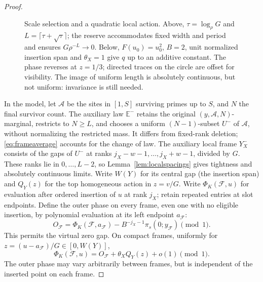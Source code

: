 \documentclass[11pt,a4paper]{article}
\newcommand{\E}{\mathbb E}
\begin{document}
\begin{proof}
\begin{figure}[t]
\caption{Scale selection and a quadratic local action.
Above, $\tau=\log_\rho G$ and $L=\lceil\tau+\sqrt\tau\rceil$;
the reserve accommodates fixed width and period and ensures $G\rho^{-L}\to0$.
Below, $F(u_0)=u_0^2$, $B=2$, unit normalized insertion span and
$\theta_X=1$ give $q$ up to an additive constant.
The phase reverses at $z=1/3$; directed traces on the circle are offset
for visibility. The image of uniform length is absolutely continuous,
but not uniform: invariance is still needed.}
\label{fig:scale}
\end{figure}

In the model, let $\mathcal A$ be the sites in $[1,S]$ surviving primes
up to $S$, and $N$ the final survivor count. The auxiliary law $\E^-$
retains the original $(y,\mathcal A,N)$-marginal, restricts to $N\ge L$,
and chooses a uniform $(N-1)$-subset $U^-$ of $\mathcal A$, without
normalizing the restricted mass. It differs from fixed-rank deletion;
\eqref{eq:frameaverage} accounts for the change of law.
The auxiliary local frame $Y_X^-$ consists of the gaps of $U^-$ at
ranks $j_X-w-1,\ldots,j_X+w-1$, divided by $G$.
These ranks lie in $0,\ldots,L-2$, so
Lemma~\ref{lem:localspacings} gives tightness and absolutely continuous
limits. Write $W(Y)$ for its central gap (the insertion span) and
$Q_Y(z)$ for the top homogeneous action in $z=v/G$.
Write $\Phi_K(\mathcal F,u)$ for evaluation after ordered insertion
of $u$ at rank $j_X$; retain repeated entries at slot endpoints.
Define the outer phase on every frame, even one with no eligible
insertion, by polynomial evaluation at its left endpoint $a_{\mathcal F}$:
\[
 O_{\mathcal F}=\Phi_K(\mathcal F,a_{\mathcal F})
              -B^{-j_X-1}\pi_s(0;y_{\mathcal F})\pmod1.
\]
This permits the virtual zero gap. On compact frames, uniformly for
$z=(u-a_{\mathcal F})/G\in[0,W(Y)]$,
\[
 \Phi_K(\mathcal F,u)=O_{\mathcal F}+\theta_XQ_Y(z)+o(1)\pmod1.
\]
The outer phase may vary arbitrarily between
frames, but is independent of the inserted point on each frame.


\end{proof}
\end{document}

